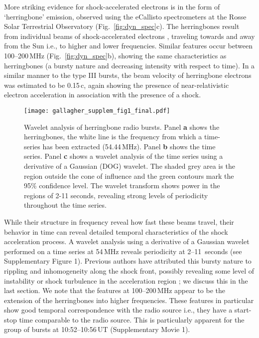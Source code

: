 More striking evidence for shock-accelerated electrons is in the form of `herringbone' emission, observed using the eCallisto spectrometers \citep{benz2009} at the Rosse Solar Terrestrial Observatory \citep[RSTO;][]{zucca2012} (Fig.~\ref{fig:dyn_spec}c). The herringbones result from individual beams of shock-accelerated electrons \citep{mann2005}, traveling towards and away from the Sun  i.e., to higher and lower frequencies. Similar features occur between 100--200\,MHz (Fig.~\ref{fig:dyn_spec}b), showing the same characteristics as herringbones (a bursty nature and decreasing intensity with respect to time). In a similar manner to the type III bursts, the beam velocity of herringbone electrons was estimated to be 0.15\,c, again showing the presence of near-relativistic electron acceleration in association with the presence of a shock. 
\begin{figure}[!t]
\begin{center}
\texttt{[image: gallagher\_supplem\_fig1\_final.pdf]}
\caption[Herringbone wavelet analysis]{Wavelet analysis of herringbone radio bursts. Panel {\bf a} shows the herringbones, the white line is the frequency from which a time-series has been extracted (54.44\,MHz). Panel {\bf b} shows the time series. Panel {\bf c} shows a wavelet analysis of the time series using a derivative of a Gaussian (DOG) wavelet. The shaded grey area is the region outside the cone of influence and the green contours mark the 95\% confidence level. The wavelet transform shows power in the regions of 2-11 seconds, revealing strong levels of periodicity throughout the time series.}
\label{wavelet}
\end{center}
\end{figure}

While their structure in frequency reveal how fast these beams travel, their behavior in time can reveal detailed temporal characteristics of the shock acceleration process.
A wavelet analysis using a derivative of a Gaussian wavelet performed on a time series at 54\,MHz reveals periodicity at 2--11~seconds (see Supplementary Figure 1). Previous authors have attributed this bursty nature to rippling and inhomogeneity along the shock front, possibly revealing some level of instability or shock turbulence in the acceleration region \citep{burgess2006, guo2010}; we discuss this in the last section. We note that the features at 100--200\,MHz appear to be the extension of the herringbones into higher frequencies. These features in particular show good temporal correspondence with the radio source i.e., they have a start-stop time comparable to the radio source. This is particularly apparent for the group of bursts at 10:52--10:56\,UT (Supplementary Movie 1).

